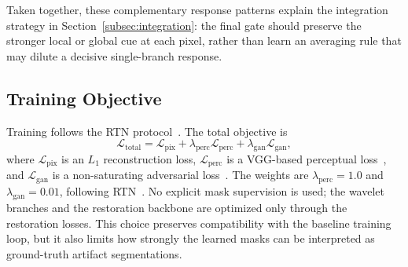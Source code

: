 Taken together, these complementary response patterns explain the integration strategy in Section~\ref{subsec:integration}: the final gate should preserve the stronger local or global cue at each pixel, rather than learn an averaging rule that may dilute a decisive single-branch response.

\subsection{Training Objective}\label{subsec:training}

Training follows the RTN protocol~\cite{rtn2022}. The total objective is
\begin{equation}\label{eq:loss_total}
    \mathcal{L}_{\mathrm{total}}=\mathcal{L}_{\mathrm{pix}}+\lambda_{\mathrm{perc}}\mathcal{L}_{\mathrm{perc}}+\lambda_{\mathrm{gan}}\mathcal{L}_{\mathrm{gan}},
\end{equation}
where $\mathcal{L}_{\mathrm{pix}}$ is an $L_1$ reconstruction loss, $\mathcal{L}_{\mathrm{perc}}$ is a VGG-based perceptual loss~\cite{johnson2016perceptual,simonyan2014vgg}, and $\mathcal{L}_{\mathrm{gan}}$ is a non-saturating adversarial loss~\cite{goodfellow2014gan}. The weights are $\lambda_{\mathrm{perc}}=1.0$ and $\lambda_{\mathrm{gan}}=0.01$, following RTN~\cite{rtn2022}. No explicit mask supervision is used; the wavelet branches and the restoration backbone are optimized only through the restoration losses. This choice preserves compatibility with the baseline training loop, but it also limits how strongly the learned masks can be interpreted as ground-truth artifact segmentations.
